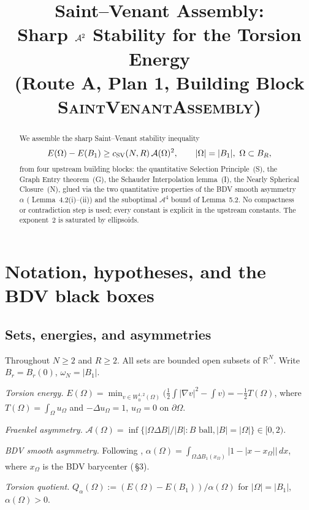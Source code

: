 \documentclass[11pt]{article}
\title{Saint--Venant Assembly:\\
Sharp $\Fr^{2}$ Stability for the Torsion Energy\\
(Route A, Plan 1, Building Block \textsc{SaintVenantAssembly})}
\author{}
\date{}
\theoremstyle{definition}
\newcommand{\R}{\mathbb{R}}
\newcommand{\Fr}{\mathcal{A}}
\begin{document}
\maketitle

\begin{abstract}
We assemble the sharp Saint--Venant stability inequality
\[
   E(\Omega)-E(B_1)\ge c_{\rm SV}(N,R)\,\Fr(\Omega)^{2},
   \qquad |\Omega|=|B_{1}|,\ \Omega\subset B_{R},
\]
from four upstream building blocks: the quantitative Selection
Principle~(S), the Graph Entry theorem~(G), the Schauder Interpolation
lemma~(I), the Nearly Spherical Closure~(N), glued via the two
quantitative properties of the BDV smooth asymmetry $\alpha$
(\cite{BDV} Lemma~4.2(i)--(ii)) and the suboptimal $\Fr^{4}$ bound of
\cite{BDV} Lemma~5.2. No compactness or contradiction step is used;
every constant is explicit in the upstream constants. The exponent~$2$
is saturated by ellipsoids.
\end{abstract}

\section{Notation, hypotheses, and the BDV black boxes}\label{sec:notation}

\subsection{Sets, energies, and asymmetries}

Throughout $N\ge 2$ and $R\ge 2$. All sets are bounded open subsets of
$\R^{N}$. Write $B_{r}=B_{r}(0)$, $\omega_{N}=|B_{1}|$.

\smallskip\noindent
\emph{Torsion energy.}
$E(\Omega)=\min_{v\in W^{1,2}_{0}(\Omega)}
\bigl(\tfrac12\int|\nabla v|^{2}-\int v\bigr)=-\tfrac12 T(\Omega)$,
where $T(\Omega)=\int_{\Omega}u_{\Omega}$ and $-\Delta u_{\Omega}=1$,
$u_{\Omega}=0$ on $\partial\Omega$.

\smallskip\noindent
\emph{Fraenkel asymmetry.}
$\Fr(\Omega)=\inf\bigl\{|\Omega\Delta B|/|B|:B\text{ ball},|B|=|\Omega|\bigr\}\in[0,2)$.

\smallskip\noindent
\emph{BDV smooth asymmetry.} Following \cite[Def.~4.1]{BDV},
$\alpha(\Omega)=\int_{\Omega\Delta B_{1}(x_{\Omega})}\bigl|1-|x-x_{\Omega}|\bigr|\,dx$,
where $x_{\Omega}$ is the BDV barycenter (\cite{BDV}\,\S3).

\smallskip\noindent
\emph{Torsion quotient.}
$Q_{\alpha}(\Omega):=(E(\Omega)-E(B_{1}))/\alpha(\Omega)$ for
$|\Omega|=|B_{1}|$, $\alpha(\Omega)>0$.
\end{document}
